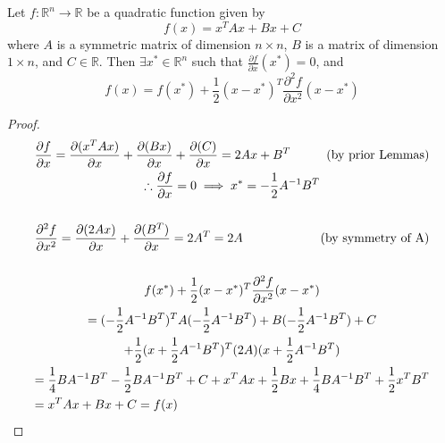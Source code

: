 \begin{lemma} \label{lemmaTaylorDecomp}
Let \(f: \mathbb{R}^n \to \mathbb{R}\) be a quadratic function given by \[f(x) = x^T Ax + Bx + C\]
where \(A\) is a symmetric matrix of dimension \(n \times n\), \(B\) is a matrix of dimension \(1 \times n\), and \(C \in \mathbb{R}\). Then \(\exists x^* \in \mathbb{R}^n\) such that \(\frac{\partial f}{\partial x}(x^*) = 0\), and  \[
f(x) = f(x^*) + \frac{1}{2} (x-x^*)^T \frac{\partial^2 f}{\partial x^2} (x-x^*)
\] 


\end{lemma}
\begin{proof}
\begin{multline*}
\frac{\partial f}{\partial x} = \frac{\partial (x^T A x)}{\partial x} + \frac{\partial (B x)}{\partial x} + \frac{\partial (C)}{\partial x} = 2Ax + B^T \hfill \text{(by prior Lemmas)} \\
\therefore \frac{\partial f}{\partial x} = 0 \implies x^* = -\frac{1}{2} A^{-1} B^T \\ \\
\frac{\partial^2 f}{\partial x^2} = \frac{\partial (2Ax)}{\partial x} + \frac{\partial (B^T)}{\partial x} = 2A^T = 2A \hfill \text{(by symmetry of A)} \\ \\
f(x^*) + \frac{1}{2} (x-x^*)^T \frac{\partial^2 f}{\partial x^2} (x-x^*) \\
= (-\frac{1}{2}A^{-1}B^T)^T A (-\frac{1}{2}A^{-1}B^T) + B(-\frac{1}{2}A^{-1}B^T) + C \\
+ \frac{1}{2}(x +\frac{1}{2}A^{-1}B^T)^T (2A) (x +\frac{1}{2}A^{-1}B^T) \\
= \frac{1}{4} B A^{-1} B^T - \frac{1}{2} B A^{-1} B^T + C + x^T A x + \frac{1}{2}Bx + \frac{1}{4} BA^{-1}B^T + \frac{1}{2}x^TB^T \\
= x^TAx + Bx + C = f(x) \hfill
\end{multline*}
\end{proof}

